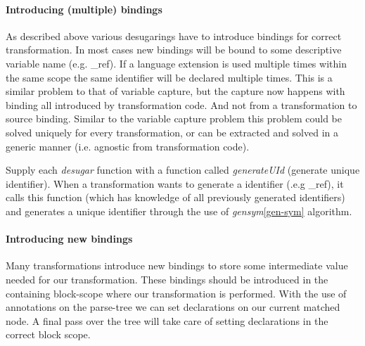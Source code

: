 \paragraph{Introducing (multiple) bindings}
As described above various desugarings have to introduce bindings for correct transformation. In most cases new bindings will be bound to some descriptive variable name (e.g. \_ref). If a language extension is used multiple times within the same scope the same identifier will be declared multiple times. This is a similar problem to that of variable capture, but the capture now happens with binding all introduced by transformation code. And not from a transformation to source binding. Similar to the variable capture problem this problem could be solved uniquely for every transformation, or can be extracted and solved in a generic manner (i.e. agnostic from transformation code). 

Supply each \textit{desugar} function with a function called \textit{generateUId} (generate unique identifier). When a transformation wants to generate a identifier (.e.g \_ref), it calls this function (which has knowledge of all previously generated identifiers) and generates a unique identifier through the use of \textit{gensym}\ref{gen-sym} algorithm.  

\paragraph{Introducing new bindings}
Many transformations introduce new bindings to store some intermediate value needed for our transformation. These bindings should be introduced in the containing block-scope where our transformation is performed. With the use of annotations on the parse-tree we can set declarations on our current matched node. A final pass over the tree will take care of setting declarations in the correct block scope.
